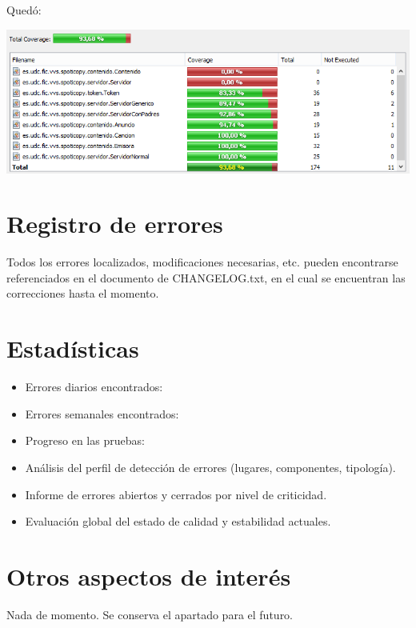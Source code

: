 \documentclass[12pt, a4paper, titlepage]{article}
\begin{document}
Quedó:

\includegraphics[width=15cm]{Imagenes/CoberturaSemana2.png} \\

\section{Registro de errores}

Todos los errores localizados, modificaciones necesarias, etc. pueden encontrarse referenciados en el documento de CHANGELOG.txt, en el cual se encuentran las correcciones hasta el momento.


\section{Estadísticas}

\begin{itemize}
	\item Errores diarios encontrados:
	\item Errores semanales encontrados:
	\item Progreso en las pruebas:
	\item Análisis del perfil de detección de errores (lugares, componentes, tipología).
	\item Informe de errores abiertos y cerrados por nivel de criticidad.
	\item Evaluación global del estado de calidad y estabilidad actuales.
\end{itemize}

\section{Otros aspectos de interés}

Nada de momento. Se conserva el apartado para el futuro.
\end{document}
